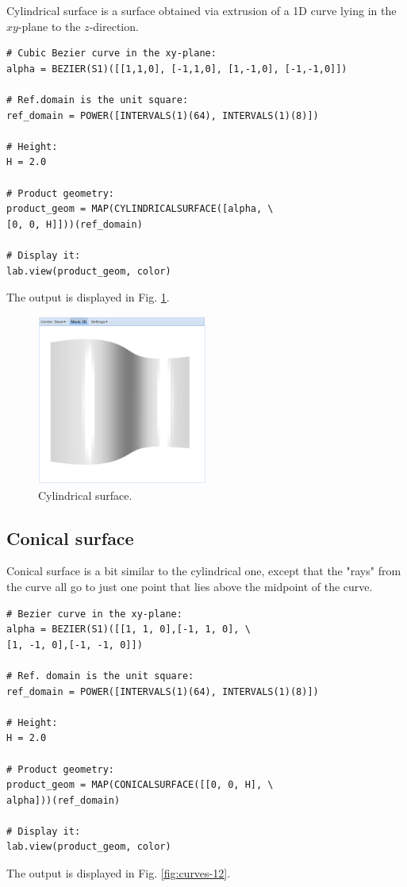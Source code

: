 \documentclass[article,A4,12pt]{llncs}
\begin{document}
Cylindrical surface is a surface obtained via extrusion of a 1D curve 
lying in the $xy$-plane to the $z$-direction.

\begin{verbatim}
# Cubic Bezier curve in the xy-plane:
alpha = BEZIER(S1)([[1,1,0], [-1,1,0], [1,-1,0], [-1,-1,0]])

# Ref.domain is the unit square:
ref_domain = POWER([INTERVALS(1)(64), INTERVALS(1)(8)])

# Height:
H = 2.0

# Product geometry:
product_geom = MAP(CYLINDRICALSURFACE([alpha, \
[0, 0, H]]))(ref_domain)

# Display it:
lab.view(product_geom, color)
\end{verbatim}
The output is displayed in Fig. \ref{fig:curves-11}.

\begin{figure}[!ht]
\begin{center}
\includegraphics[width=0.5\textwidth]{img/curves-11.png}
\end{center}
\vspace{-2mm}
\caption{Cylindrical surface.}
\label{fig:curves-11}
\end{figure}


\subsection{Conical surface}

Conical surface is a bit similar to the cylindrical one, 
except that the "rays" from the curve all go to just one
point that lies above the midpoint of the curve.

\begin{verbatim}
# Bezier curve in the xy-plane:
alpha = BEZIER(S1)([[1, 1, 0],[-1, 1, 0], \
[1, -1, 0],[-1, -1, 0]])

# Ref. domain is the unit square:
ref_domain = POWER([INTERVALS(1)(64), INTERVALS(1)(8)])

# Height:
H = 2.0

# Product geometry:
product_geom = MAP(CONICALSURFACE([[0, 0, H], \
alpha]))(ref_domain)

# Display it:
lab.view(product_geom, color)
\end{verbatim}
The output is displayed in Fig. \ref{fig:curves-12}.
\end{document}
